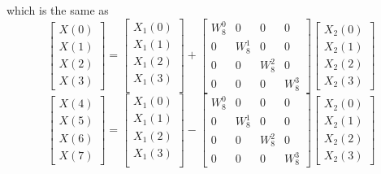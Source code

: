 \documentclass[journal,12pt,twocolumn]{IEEEtran}
\renewcommand\thesection{\arabic{section}}
\begin{document}
\begin{enumerate}[label=\thesection.\arabic*]
which is the same as
\begin{equation}
\begin{bmatrix}
X(0) \\ 
X(1) \\ 
X(2) \\ 
X(3)
\end{bmatrix}
=
\begin{bmatrix}
X_{1}(0) \\ 
X_{1}(1)\\ 
X_{1}(2)\\
X_{1}(3)\\
\end{bmatrix}
+
\begin{bmatrix}
W^{0}_{8} & 0 & 0 & 0\\
0 & W^{1}_{8} & 0 & 0\\
0 & 0 & W^{2}_{8} & 0\\
0 & 0 & 0 & W^{3}_{8}
\end{bmatrix}
\begin{bmatrix}
X_{2}(0) \\ 
X_{2}(1) \\ 
X_{2}(2) \\
X_{2}(3)
\end{bmatrix}
\end{equation}
\begin{equation}
\begin{bmatrix}
X(4) \\ 
X(5) \\ 
X(6) \\ 
X(7)
\end{bmatrix}
=
\begin{bmatrix}
X_{1}(0) \\ 
X_{1}(1)\\ 
X_{1}(2)\\
X_{1}(3)\\
\end{bmatrix}
-
\begin{bmatrix}
W^{0}_{8} & 0 & 0 & 0\\
0 & W^{1}_{8} & 0 & 0\\
0 & 0 & W^{2}_{8} & 0\\
0 & 0 & 0 & W^{3}_{8}
\end{bmatrix}
\begin{bmatrix}
X_{2}(0) \\ 
X_{2}(1) \\ 
X_{2}(2) \\
X_{2}(3)
\end{bmatrix}
\end{equation}


\end{enumerate}
\end{document}

